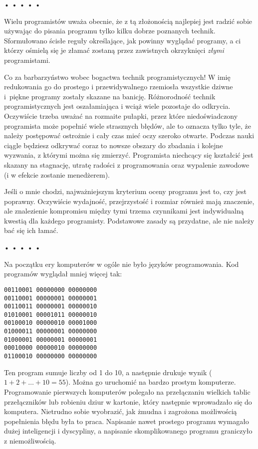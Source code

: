 \begin{center}
• • • • •
\end{center}

  
Wielu programistów uważa obecnie, że z tą złożonością najlepiej jest radzić sobie używając do pisania programu tylko kilku dobrze poznanych technik. Sformułowano ścisłe reguły określające, jak powinny wyglądać programy, a ci którzy ośmielą się je złamać zostaną przez zawistnych okrzyknięci \emph{złymi} programistami.

  
Co za barbarzyństwo wobec bogactwa technik programistycznych! W imię redukowania go do prostego i przewidywalnego rzemiosła wszystkie dziwne i~piękne programy zostały skazane na banicję. Różnorodność technik programistycznych jest oszałamiająca i wciąż wiele pozostaje do odkrycia. Oczywiście trzeba uważać na rozmaite pułapki, przez które niedoświadczony programista może popełnić wiele strasznych błędów, ale to oznacza tylko tyle, że należy postępować ostrożnie i cały czas mieć oczy szeroko otwarte. Podczas nauki ciągle będziesz odkrywać coraz to nowsze obszary do zbadania i kolejne wyzwania, z którymi można się zmierzyć. Programista niechcący się kształcić jest skazany na stagnację, utratę radości z programowania oraz wypalenie zawodowe (i w efekcie zostanie menedżerem).

  
Jeśli o mnie chodzi, najważniejszym kryterium oceny programu jest to, czy jest poprawny. Oczywiście wydajność, przejrzystość i rozmiar również mają znaczenie, ale znalezienie kompromisu między tymi trzema czynnikami jest indywidualną kwestią dla każdego programisty. Podstawowe zasady są przydatne, ale nie należy bać się ich łamać.


\begin{center}
• • • • •
\end{center}

  
Na początku ery komputerów w ogóle nie było języków programowania. Kod programów wyglądał mniej więcej tak:

  
\begin{verbatim} 
00110001 00000000 00000000
00110001 00000001 00000001
00110011 00000001 00000010
01010001 00001011 00000010
00100010 00000010 00001000
01000011 00000001 00000000
01000001 00000001 00000001
00010000 00000010 00000000
01100010 00000000 00000000
 \end{verbatim}
  
Ten program sumuje liczby od 1 do 10, a następnie drukuje wynik ($1 + 2 + … + 10 = 55$). Można go uruchomić na bardzo prostym komputerze. Programowanie pierwszych komputerów polegało na przełączaniu wielkich tablic przełączników lub robieniu dziur w kartonie, który następnie wprowadzało się do komputera. Nietrudno sobie wyobrazić, jak żmudna i zagrożona możliwością popełnienia błędu była to praca. Napisanie nawet prostego programu wymagało dużej inteligencji i dyscypliny, a napisanie skomplikowanego programu graniczyło z niemożliwością.

